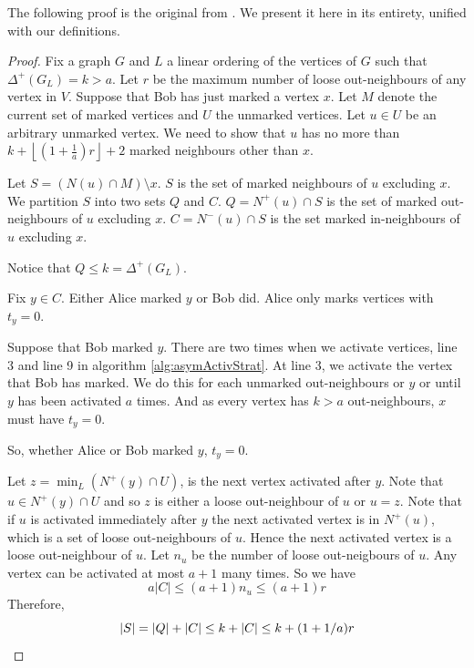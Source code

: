 The following proof is the original from \cite{yangZhu2008}. We present it here in its entirety, unified with our definitions.

\begin{proof}
%
Fix a graph $G$ and $L$ a linear ordering of the vertices of $G$ such that $\Delta^+(G_L)=k>a$. Let $r$ be the maximum number of loose out-neighbours of any vertex in $V$. Suppose that Bob has just marked a vertex $x$. Let $M$ denote the current set of marked vertices and $U$ the unmarked vertices. Let $u\in U$ be an arbitrary unmarked vertex. We need to show that $u$ has no more than  $k+\left\lfloor \left(1+\frac{1}{a}\right)r \right\rfloor +2$ marked neighbours other than $x$. 

Let $S=(N(u)\cap M) \setminus {x}$. $S$ is the set of marked neighbours of $u$ excluding $x$. We partition $S$ into two sets $Q$ and $C$. $Q=N^+(u)\cap S$ is the set of marked out-neighbours of $u$ excluding $x$. $C=N^-(u)\cap S$ is  the set marked in-neighbours of $u$ excluding $x$.

Notice that $Q\leq k = \Delta^+(G_L)$. 

Fix $y\in C$. Either Alice marked $y$ or Bob did. Alice only marks vertices with $t_y=0$. 

Suppose that Bob marked $y$.
There are two times when we activate vertices, line 3 and line 9 in algorithm \ref{alg:asymActivStrat}. At line 3, we activate the vertex that Bob has marked. We do this for each unmarked out-neighbours or $y$ or until $y$ has been activated $a$ times. And as every vertex has $k>a$ out-neighbours, $x$ must have $t_y=0$.

So, whether Alice or Bob marked $y$, $t_y=0$.

Let $z = \min_{L}(N^+(y)\cap U)$, is the next vertex activated after $y$. Note that $u\in N^+(y)\cap U$ and so $z$ is either a loose out-neighbour of $u$ or $u=z$. Note that if $u$ is activated immediately after $y$ the next activated vertex is in $N^+(u)$, which is a set of loose out-neighbours of $u$. Hence the next activated vertex is a loose out-neighbour of $u$. Let $n_u$ be the number of loose out-neigbours of $u$. Any vertex can be activated at most $a+1$ many times. So we have 
\[a|C|\leq (a+1)n_u\leq (a+1)r\]
Therefore,
\[|S|=|Q|+|C|\leq k +|C| \leq k + (1+1/a)r \qedhere\] 
\end{proof}

    
